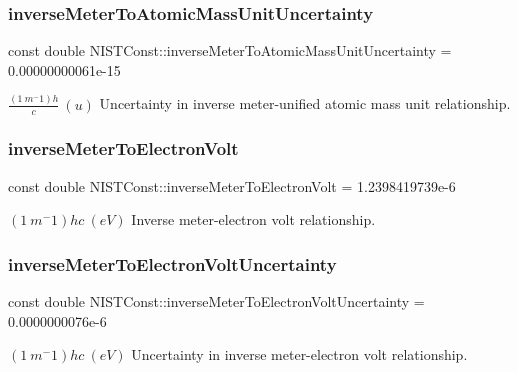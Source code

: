 \subsubsection{\texorpdfstring{inverse\+Meter\+To\+Atomic\+Mass\+Unit\+Uncertainty}{inverseMeterToAtomicMassUnitUncertainty}}
{\footnotesize\ttfamily const double N\+I\+S\+T\+Const\+::inverse\+Meter\+To\+Atomic\+Mass\+Unit\+Uncertainty = 0.\+00000000061e-\/15}

$\frac{(1\ m^-1)h}{c} \ (u)$ Uncertainty in inverse meter-\/unified atomic mass unit relationship. \mbox{\label{group___n_i_s_t_const-_inverse_meter_gafdede27a7699d3a180bb829b65fac447}} 
\subsubsection{\texorpdfstring{inverse\+Meter\+To\+Electron\+Volt}{inverseMeterToElectronVolt}}
{\footnotesize\ttfamily const double N\+I\+S\+T\+Const\+::inverse\+Meter\+To\+Electron\+Volt = 1.\+2398419739e-\/6}

$(1\ m^-1)hc \ (eV)$ Inverse meter-\/electron volt relationship. \mbox{\label{group___n_i_s_t_const-_inverse_meter_gaffb7462545a03fb13544c9f65d77dc7e}} 
\subsubsection{\texorpdfstring{inverse\+Meter\+To\+Electron\+Volt\+Uncertainty}{inverseMeterToElectronVoltUncertainty}}
{\footnotesize\ttfamily const double N\+I\+S\+T\+Const\+::inverse\+Meter\+To\+Electron\+Volt\+Uncertainty = 0.\+0000000076e-\/6}

$(1\ m^-1)hc \ (eV)$ Uncertainty in inverse meter-\/electron volt relationship. \mbox{\label{group___n_i_s_t_const-_inverse_meter_ga6f47bdfe8997031b0f15229eb5bf4b9e}} 
